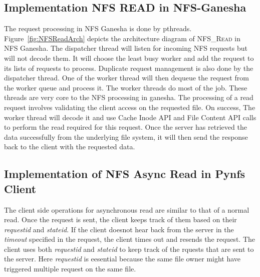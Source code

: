 \subsection{Implementation NFS READ in NFS-Ganesha}

 The request processing in NFS Ganesha is done by pthreads. Figure~\ref{fig:NFSReadArch} depicts the architecture diagram of \textsc{NFS\_Read} in NFS Ganesha. The dispatcher thread will listen for incoming NFS requests but will not decode them. It will choose the least busy worker and add the request to its lists of requests to process. Duplicate
request management is also done by the dispatcher thread. One of the worker thread will then dequeue the request from the worker queue and process it. The worker threads do most of the job. These threads are very core to the NFS processing in ganesha. The processing of a read request involves validating the client access on the requested file. On success, The worker thread will decode it and use Cache Inode API and File Content API calls to perform the read required for this request. Once the server has retrieved the data successfully from the underlying file system, it will then send the response back to the client with the requested data.
 
\subsection{Implementation of NFS Async Read in Pynfs Client}
 
The client side operations for asynchronous read are similar to that of a normal read. Once the request is sent, the client keeps track of them based on their \textit{requestid} and \textit{stateid}. If the client doesnot hear back from the server in the \textit{timeout} specified in the request, the client times out and resends the request. The client uses both \textit{requestid} and \textit{stateid} to keep track of the rquests that are sent to the server.  Here \textit{requestid} is eesential because the same file owner might have triggered multiple request on the same file.  
  
